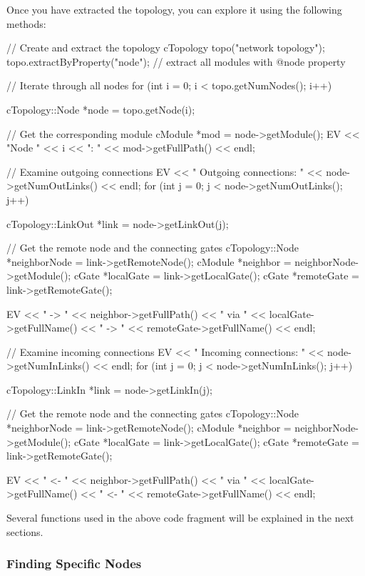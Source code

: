 Once you have extracted the topology, you can explore it using the following methods:

\begin{cpp}
// Create and extract the topology
cTopology topo("network topology");
topo.extractByProperty("node");  // extract all modules with @node property

// Iterate through all nodes
for (int i = 0; i < topo.getNumNodes(); i++) {
    cTopology::Node *node = topo.getNode(i);

    // Get the corresponding module
    cModule *mod = node->getModule();
    EV << "Node " << i << ": " << mod->getFullPath() << endl;

    // Examine outgoing connections
    EV << "  Outgoing connections: " << node->getNumOutLinks() << endl;
    for (int j = 0; j < node->getNumOutLinks(); j++) {
        cTopology::LinkOut *link = node->getLinkOut(j);

        // Get the remote node and the connecting gates
        cTopology::Node *neighborNode = link->getRemoteNode();
        cModule *neighbor = neighborNode->getModule();
        cGate *localGate = link->getLocalGate();
        cGate *remoteGate = link->getRemoteGate();

        EV << "    -> " << neighbor->getFullPath()
           << " via " << localGate->getFullName()
           << " -> " << remoteGate->getFullName() << endl;
    }

    // Examine incoming connections
    EV << "  Incoming connections: " << node->getNumInLinks() << endl;
    for (int j = 0; j < node->getNumInLinks(); j++) {
        cTopology::LinkIn *link = node->getLinkIn(j);

        // Get the remote node and the connecting gates
        cTopology::Node *neighborNode = link->getRemoteNode();
        cModule *neighbor = neighborNode->getModule();
        cGate *localGate = link->getLocalGate();
        cGate *remoteGate = link->getRemoteGate();

        EV << "    <- " << neighbor->getFullPath()
           << " via " << localGate->getFullName()
           << " <- " << remoteGate->getFullName() << endl;
    }
}
\end{cpp}

Several functions used in the above code fragment will be explained in the
next sections.

\subsubsection{Finding Specific Nodes}
\label{sec:sim-lib:ctopology-finding-nodes}

